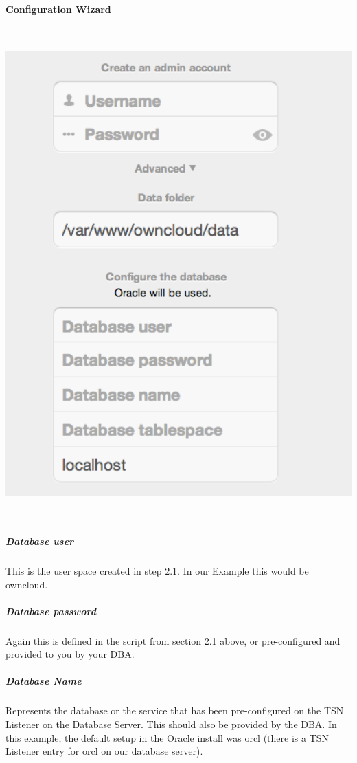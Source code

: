 \documentclass[letterpaper,10pt,english]{sphinxmanual}
\begin{document}
\paragraph{Configuration Wizard}
\label{enterprise_installation/oracle_db_configuration:configuration-wizard}
\includegraphics[width=5.778in,height=7.4165in]{oracle-1.png}


\subparagraph{Database user}
\label{enterprise_installation/oracle_db_configuration:database-user}
This is the user space created in step 2.1.
In our Example this would be owncloud.


\subparagraph{Database password}
\label{enterprise_installation/oracle_db_configuration:database-password}
Again this is defined in the script from section 2.1 above, or pre-configured and provided to you by your DBA.


\subparagraph{Database Name}
\label{enterprise_installation/oracle_db_configuration:database-name}
Represents the database or the service that has been pre-configured on the TSN Listener on the Database Server.
This should also be provided by the DBA.
In this example, the default setup in the Oracle install was orcl (there is a TSN Listener entry for orcl on our database server).
\end{document}
